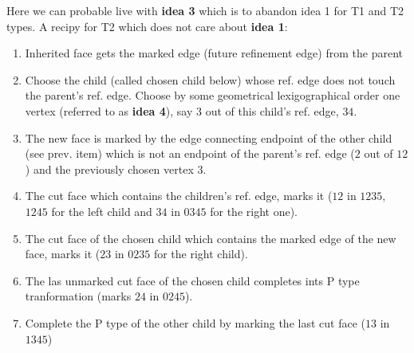 \documentclass[a4paper,12pt]{amsart}
\numberwithin{equation}{section}
\begin{document}
\begin{itemize}
		Here we can probable live with \textbf{idea 3} which is to abandon idea 1 for T1 and T2 types.
		A recipy for T2 which does not care about \textbf{idea 1}:
    	\begin{enumerate}
		\item Inherited face gets the marked edge (future refinement edge) from the parent
		\item Choose the child (called chosen child below) whose ref. edge does not touch the parent's ref. edge. Choose by some geometrical lexigographical order one vertex (referred to as \textbf{idea 4}), say $3$ out of this child's ref. edge, $34$.
		\item The new face is marked by the edge connecting endpoint of the other child (see prev. item) which is not an endpoint of the parent's ref. edge ($2$ out of $12$) and the previously chosen vertex $3$.
		\item The cut face which contains the children's ref. edge, marks it ($12$ in $1235$, $1245$ for the left child and $34$ in $0345$ for the right one).
		\item The cut face of the chosen child which contains the marked edge of the new face, marks it ($23$ in $0235$ for the right child).
		\item The las unmarked cut face of the chosen child completes ints P type tranformation (marks $24$ in $0245$).
		\item Complete the P type of the other child by marking the last cut face ($13$ in $1345$)
		\end{enumerate}
		
	
	

	  \begin{minipage}[]{0.4\textwidth}
	  \begin{center}
\end{center}
\end{minipage}
\end{itemize}
\end{document}

